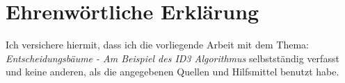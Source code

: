 \chapter*{Ehrenwörtliche Erklärung}
\label{ewerkl}

Ich versichere hiermit, dass ich die vorliegende Arbeit mit dem Thema: \textit{Entscheidungsbäume - Am Beispiel des ID3 Algorithmus} selbstständig verfasst und keine anderen, als die angegebenen Quellen und Hilfsmittel benutzt habe.